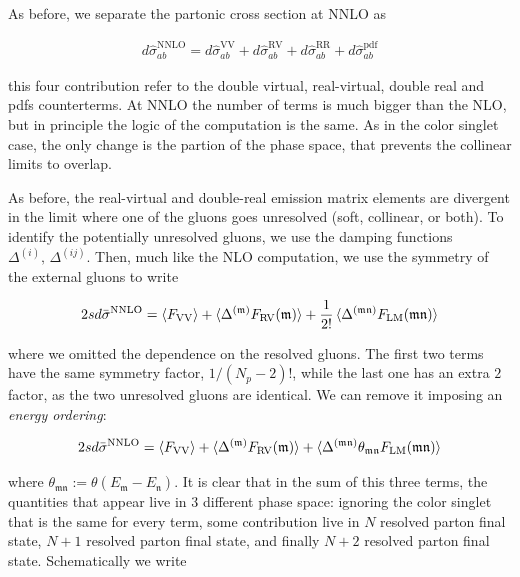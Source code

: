 \documentclass[11pt]{report}
\begin{document}
As before, we separate the partonic cross section at NNLO as 

\begin{align}
    d\hat{\sigma}_{ab}^{\text{NNLO}} = d\hat{\sigma}_{ab}^{\text{VV}} + d\hat{\sigma}_{ab}^{\text{RV}} + d\hat{\sigma}_{ab}^{\text{RR}} + d\hat{\sigma}_{ab}^{\text{pdf}} 
\end{align}

this four contribution refer to the double virtual, real-virtual, double real and pdfs counterterms. At NNLO the number of terms is much bigger than the NLO, but in principle the logic of the computation is the same. As in the color singlet case, the only change is the partion of the phase space, that prevents the collinear limits to overlap. 

As before, the real-virtual and double-real emission matrix elements are divergent in the limit where one of the gluons goes unresolved (soft, collinear, or both). To identify the potentially unresolved gluons, we use the damping functions \(\Delta^{(i)}, \, \Delta^{(ij)}\). Then, much like the NLO computation, we use the symmetry of the external gluons to write 

\begin{align}
    2s d\bar{\sigma}^{\text{NNLO}} = \braket{F_{\text{VV}}} + \braket{\Delta^{(\mathfrak{m})}F_{\text{RV}}(\mathfrak{m})} + \frac{1}{2!}\braket{\Delta^{(\mathfrak{mn})}F_{\text{LM}}({\mathfrak{mn}})}
\end{align}

where we omitted the dependence on the resolved gluons. The first two terms have the same symmetry factor, \(1/(N_p-2)!\), while the last one has an extra \(2\) factor, as the two unresolved gluons are identical. We can remove it imposing an \emph{energy ordering}:

\begin{align}
    2s d\bar{\sigma}^{\text{NNLO}} = \braket{F_{\text{VV}}} + \braket{\Delta^{(\mathfrak{m})}F_{\text{RV}}(\mathfrak{m})} + \braket{\Delta^{(\mathfrak{mn})}\theta_{\mathfrak{mn}}F_{\text{LM}}({\mathfrak{mn}})}
\end{align}

where \(\theta_{\mathfrak{mn}} := \theta(E_{\mathfrak{m}} - E_{\mathfrak{n}})\). It is clear that in the sum of this three terms, the quantities that appear live in 3 different phase space: ignoring the color singlet that is the same for every term, some contribution live in \(N\) resolved parton final state, \(N+1\) resolved parton final state, and finally \(N+2\) resolved parton final state. Schematically we write 
\end{document}
